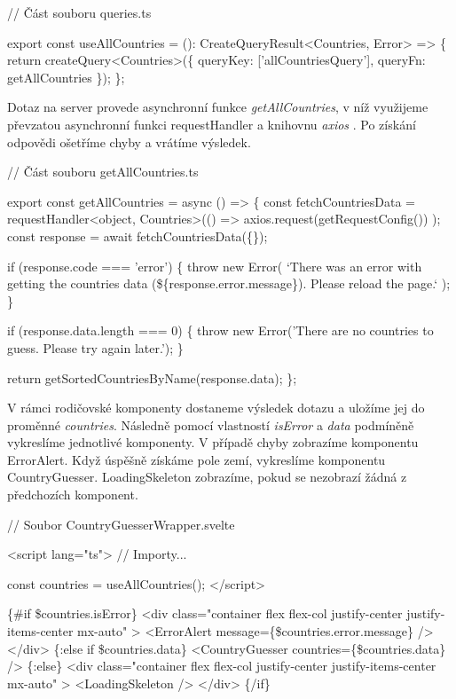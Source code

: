 \begin{prog}
// Část souboru queries.ts

export const useAllCountries = (): CreateQueryResult<Countries, Error> => \{
  return createQuery<Countries>(\{
    queryKey: ['allCountriesQuery'], queryFn: getAllCountries
  \});
\};
\end{prog}

Dotaz na server provede asynchronní funkce \emph{getAllCountries}, v níž využijeme převzatou asynchronní funkci requestHandler a knihovnu \emph{axios} \cite{axioslib}. 
Po získání odpovědi ošetříme chyby a vrátíme výsledek.

\begin{prog}
// Část souboru getAllCountries.ts

export const getAllCountries = async () => \{
  const fetchCountriesData = requestHandler<object, Countries>(() =>
    axios.request(getRequestConfig())
  );
  const response = await fetchCountriesData(\{\});

  if (response.code === 'error') \{
    throw new Error(
      `There was an error with getting the countries data 
      (\$\{response.error.message\}). Please reload the page.`
    );
  \}

  if (response.data.length === 0) \{
    throw new Error('There are no countries to guess. Please try again later.');
  \}

  return getSortedCountriesByName(response.data);
\};
\end{prog}

V rámci rodičovské komponenty dostaneme výsledek dotazu a uložíme jej do proměnné \emph{countries}. Následně pomocí vlastností \emph{isError} a \emph{data} podmíněně vykreslíme jednotlivé komponenty. 
V případě chyby zobrazíme komponentu ErrorAlert. Když úspěšně získáme pole zemí, vykreslíme komponentu CountryGuesser. LoadingSkeleton zobrazíme, pokud se nezobrazí žádná z předchozích komponent.

\begin{prog}
// Soubor CountryGuesserWrapper.svelte

<script lang="ts">
  // Importy...

  const countries = useAllCountries();
</script>

\{#if \$countries.isError\}
  <div 
    class="container flex flex-col justify-center justify-items-center mx-auto"
  >
    <ErrorAlert message=\{\$countries.error.message\} />
  </div>
\{:else if \$countries.data\}
  <CountryGuesser countries=\{\$countries.data\} />
\{:else\}
  <div 
    class="container flex flex-col justify-center justify-items-center mx-auto"
  >
    <LoadingSkeleton />
  </div>
\{/if\}
\end{prog}

